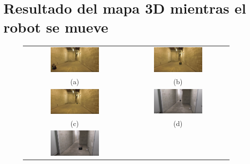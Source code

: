 \section{Resultado del mapa 3D mientras el robot se mueve}
\begin{figure}
  \begin{tabular}{cc}
    \centering \footnotesize
    \includegraphics[width=0.50\textwidth]{images/KobukiSotano1.png}&
    \includegraphics[width=0.50\textwidth]{images/KobukiSotano2.png}\\
    (a)&(b)\\
    \includegraphics[width=0.50\textwidth]{images/KobukiSotano3.png}&
    \includegraphics[width=0.50\textwidth]{images/KobukiSotano4.png}\\
    (c)&(d)\\
    \includegraphics[width=0.50\textwidth]{images/KobukiSotano5.png}&

\end{tabular}
\end{figure}

